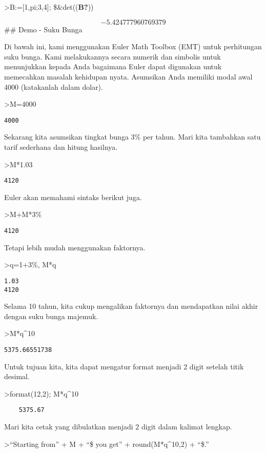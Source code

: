 \documentclass[
]{book}
\begin{document}
\textgreater B:={[}1,pi;3,4{]}; \$\&det((\textbf{B?}))

\[-5.424777960769379\]\#\# Demo - Suku Bunga

Di bawah ini, kami menggunakan Euler Math Toolbox (EMT) untuk perhitungan suku bunga. Kami melakukannya secara numerik dan simbolis untuk menunjukkan kepada Anda bagaimana Euler dapat digunakan untuk memecahkan masalah kehidupan nyata. Asumsikan Anda memiliki modal awal 4000 (katakanlah dalam dolar).

\textgreater M=4000

\begin{verbatim}
4000
\end{verbatim}

Sekarang kita asumsikan tingkat bunga 3\% per tahun. Mari kita tambahkan satu tarif sederhana dan hitung hasilnya.

\textgreater M*1.03

\begin{verbatim}
4120
\end{verbatim}

Euler akan memahami sintaks berikut juga.

\textgreater M+M*3\%

\begin{verbatim}
4120
\end{verbatim}

Tetapi lebih mudah menggunakan faktornya.

\textgreater q=1+3\%, M*q

\begin{verbatim}
1.03
4120
\end{verbatim}

Selama 10 tahun, kita cukup mengalikan faktornya dan mendapatkan nilai akhir dengan suku bunga majemuk.

\textgreater M*q\^{}10

\begin{verbatim}
5375.66551738
\end{verbatim}

Untuk tujuan kita, kita dapat mengatur format menjadi 2 digit setelah titik desimal.

\textgreater format(12,2); M*q\^{}10

\begin{verbatim}
    5375.67 
\end{verbatim}

Mari kita cetak yang dibulatkan menjadi 2 digit dalam kalimat lengkap.

\textgreater{}``Starting from'' + M + ``\$ you get'' + round(M*q\^{}10,2) + ``\$.''
\end{document}
